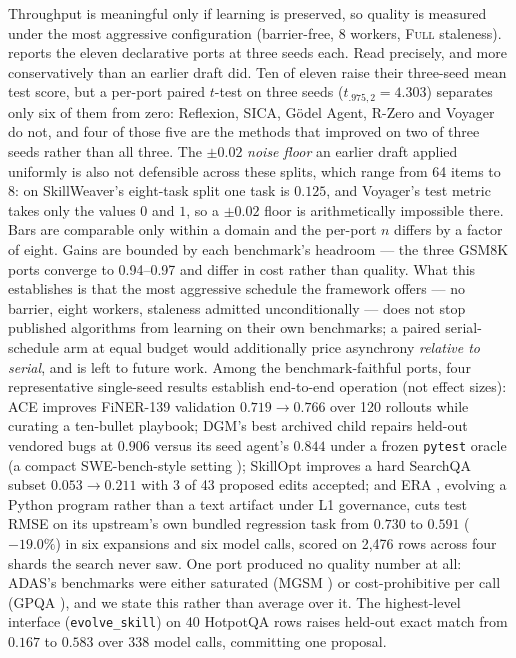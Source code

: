 \documentclass{article}
\newcommand{\code}[1]{\texttt{#1}}
\begin{document}
Throughput is meaningful only if learning is preserved, so quality is measured under the most aggressive configuration (barrier-free, 8 workers, \textsc{Full} staleness).  reports the eleven declarative ports at three seeds each. Read precisely, and more conservatively than an earlier draft did. Ten of eleven raise their three-seed mean test score, but a per-port paired $t$-test on three seeds ($t_{.975,2} = 4.303$) separates only six of them from zero: Reflexion, SICA, G\"odel Agent, R-Zero and Voyager do not, and four of those five are the methods that improved on two of three seeds rather than all three. The $\pm 0.02$ \emph{noise floor} an earlier draft applied uniformly is also not defensible across these splits, which range from 64 items to 8: on SkillWeaver's eight-task split one task is $0.125$, and Voyager's test metric takes only the values $0$ and $1$, so a $\pm 0.02$ floor is arithmetically impossible there. Bars are comparable only within a domain and the per-port $n$ differs by a factor of eight. Gains are bounded by each benchmark's headroom --- the three GSM8K \citep{cobbe2021gsm8k} ports converge to 0.94--0.97 and differ in cost rather than quality. What this establishes is that the most aggressive schedule the framework offers --- no barrier, eight workers, staleness admitted unconditionally --- does not stop published algorithms from learning on their own benchmarks; a paired serial-schedule arm at equal budget would additionally price asynchrony \emph{relative to serial}, and is left to future work. Among the benchmark-faithful ports, four representative single-seed results establish end-to-end operation (not effect sizes): ACE improves FiNER-139 \citep{loukas2022finer} validation $0.719 \to 0.766$ over 120 rollouts while curating a ten-bullet playbook; DGM's best archived child repairs held-out vendored bugs at $0.906$ versus its seed agent's $0.844$ under a frozen \code{pytest} oracle (a compact SWE-bench-style setting \citep{jimenez2023swebench}); SkillOpt improves a hard SearchQA \citep{dunn2017searchqa} subset $0.053 \to 0.211$ with 3 of 43 proposed edits accepted; and ERA \citep{aygun2025era}, evolving a Python program rather than a text artifact under L1 governance, cuts test RMSE on its upstream's own bundled regression task from $0.730$ to $0.591$ ($-19.0\%$) in six expansions and six model calls, scored on 2{,}476 rows across four shards the search never saw. One port produced no quality number at all: ADAS's benchmarks were either saturated (MGSM \citep{shi2022mgsm}) or cost-prohibitive per call (GPQA \citep{rein2023gpqa}), and we state this rather than average over it. The highest-level interface (\code{evolve\_skill}) on 40 HotpotQA rows raises held-out exact match from $0.167$ to $0.583$ over 338 model calls, committing one proposal.
\end{document}
